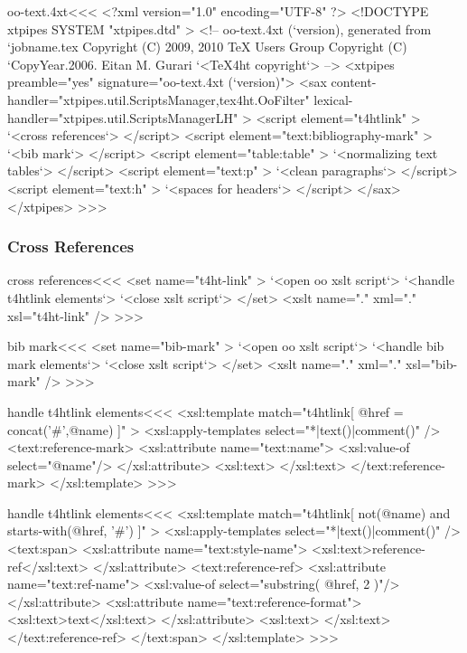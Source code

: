 \documentclass{article}
\begin{document}





\<oo-text.4xt\><<<
<?xml version="1.0" encoding="UTF-8" ?>
<!DOCTYPE xtpipes SYSTEM "xtpipes.dtd" >
<!-- oo-text.4xt (`version), generated from `jobname.tex
     Copyright (C) 2009, 2010 TeX Users Group
     Copyright (C) `CopyYear.2006. Eitan M. Gurari
`<TeX4ht copyright`> -->
<xtpipes preamble="yes" signature="oo-text.4xt (`version)">
   <sax content-handler="xtpipes.util.ScriptsManager,tex4ht.OoFilter" 
        lexical-handler="xtpipes.util.ScriptsManagerLH" >
      <script element="t4htlink" >
         `<cross references`>
      </script> 
      <script element="text:bibliography-mark" >
         `<bib mark`>
      </script> 
      <script element="table:table" >
         `<normalizing text tables`>
      </script> 
      <script element="text:p" >
         `<clean paragraphs`>
      </script> 
      <script element="text:h" >
         `<spaces for headers`>
      </script> 
   </sax>
</xtpipes>
>>>


\subsubsection{Cross References}



\<cross references\><<<
<set name="t4ht-link" >
   `<open oo xslt script`>
    `<handle t4htlink elements`>
   `<close xslt script`>
</set>
<xslt name="." xml="." xsl="t4ht-link" />
>>>

\<bib mark\><<<
<set name="bib-mark" >
   `<open oo xslt script`>
    `<handle bib mark elements`>
   `<close xslt script`>
</set>
<xslt name="." xml="." xsl="bib-mark" />
>>>



\<handle t4htlink elements\><<<
<xsl:template match="t4htlink[ @href = concat('#',@name) ]" >
  <xsl:apply-templates select="*|text()|comment()" />
  <text:reference-mark>
     <xsl:attribute name="text:name">
        <xsl:value-of select="@name"/>
     </xsl:attribute>
     <xsl:text> </xsl:text>
  </text:reference-mark>
</xsl:template> 
>>>

\<handle t4htlink elements\><<<
<xsl:template match="t4htlink[ not(@name) 
                           and
                               starts-with(@href, '#') 
]" >
  <xsl:apply-templates select="*|text()|comment()" />
   <text:span>
        <xsl:attribute name="text:style-name">
           <xsl:text>reference-ref</xsl:text>
        </xsl:attribute>
     <text:reference-ref>
        <xsl:attribute name="text:ref-name">
           <xsl:value-of select="substring( @href, 2 )"/>
        </xsl:attribute>
        <xsl:attribute name="text:reference-format">
           <xsl:text>text</xsl:text>
        </xsl:attribute>
        <xsl:text> </xsl:text>   
     </text:reference-ref>
   </text:span>
</xsl:template> 
>>>
\end{document}
